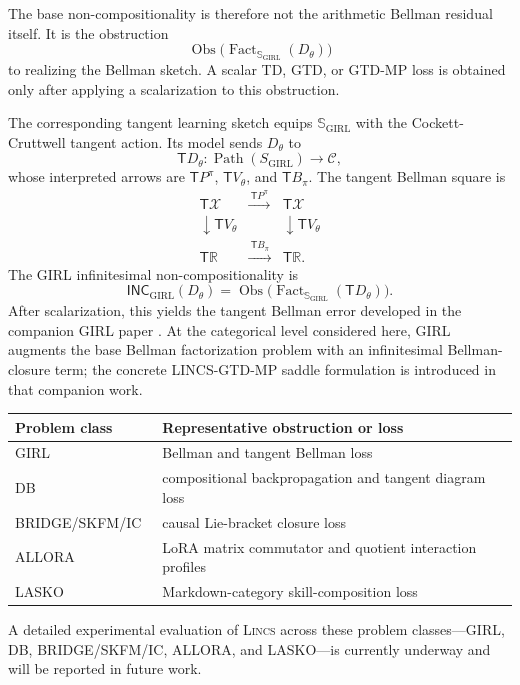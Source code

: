 \documentclass{article}
\newcommand{\C}{\mathcal{C}}
\newcommand{\R}{\mathbb{R}}
\newcommand{\T}{\mathsf{T}}
\newcommand{\INC}{\mathsf{INC}}
\newcommand{\Fact}{\operatorname{Fact}}
\newcommand{\Path}{\operatorname{Path}}
\newcommand{\Obs}{\operatorname{Obs}}
\begin{document}
The base non-compositionality is therefore not the arithmetic Bellman residual itself. It is the obstruction
\[
\Obs\big(\Fact_{\mathbb S_{\mathrm{GIRL}}}(D_\theta)\big)
\]
to realizing the Bellman sketch. A scalar TD, GTD, or GTD-MP loss is obtained only after applying a scalarization to this obstruction.

The corresponding tangent learning sketch equips \(\mathbb S_{\mathrm{GIRL}}\) with the Cockett-Cruttwell tangent action. Its model sends \(D_\theta\) to
\[
\T D_\theta:\Path(S_{\mathrm{GIRL}})\to\C,
\]
whose interpreted arrows are \(\T P^\pi\), \(\T V_\theta\), and \(\T B_\pi\). The tangent Bellman square is
\[
\begin{array}{ccc}
\T\mathcal X & \xrightarrow{\ \T P^\pi\ } & \T\mathcal X\\
\downarrow \T V_\theta && \downarrow \T V_\theta\\
\T\R & \xrightarrow{\ \T B_\pi\ } & \T\R .
\end{array}
\]
The GIRL infinitesimal non-compositionality is
\[
\INC_{\mathrm{GIRL}}(D_\theta)
  =
  \Obs\big(\Fact_{\mathbb S_{\mathrm{GIRL}}}(\T D_\theta)\big).
\]
After scalarization, this yields the tangent Bellman error developed in the
companion GIRL paper \citep{mahadevan2026girl}.  At the categorical level considered here, GIRL augments
the base Bellman factorization problem with an infinitesimal Bellman-closure
term; the concrete LINCS-GTD-MP saddle formulation is introduced in that
companion work.

\begin{center}
\begin{tabular}{ll}
\toprule
Problem class & Representative obstruction or loss\\
\midrule
GIRL~\citep{mahadevan2026girl} & Bellman and tangent Bellman loss\\
DB~\citep{mahadevan2026catagi} & compositional backpropagation and tangent diagram loss\\
BRIDGE/SKFM/IC~\citep{mahadevan2026bridge} & causal Lie-bracket closure loss\\
ALLORA~\citep{mahadevan2026allora} & LoRA matrix commutator and quotient interaction profiles\\
LASKO~\citep{mahadevan2026lasko} & Markdown-category skill-composition loss\\
\bottomrule
\end{tabular}
\end{center}

A detailed experimental evaluation of \textsc{Lincs} across these problem
classes---GIRL, DB, BRIDGE/SKFM/IC, ALLORA, and LASKO---is currently underway
and will be reported in future work.
\end{document}
